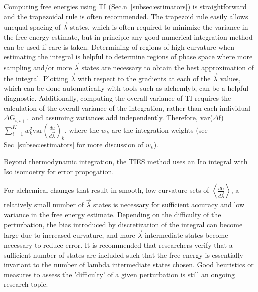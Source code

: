 \documentclass[9pt,bestpractices]{livecoms}
\newcommand{\expect}[1]{\left\langle{#1}\right\rangle}
\begin{document}
Computing free energies using TI (Sec.n~\ref{subsec:estimators}) is straightforward and the trapezoidal rule is often recommended. The trapezoid rule easily allows unequal spacing of $\vec{\lambda}$ states, which is often required to minimize the variance in the free energy estimate, but in principle any good numerical integration method can be used if care is taken.  
Determining of regions of high curvature when estimating the integral is helpful to determine regions of phase space where more sampling and/or more $\vec{\lambda}$ states are necessary to obtain the best approximation of the integral. Plotting $\vec{\lambda}$ with respect to the gradients at each of the $\vec{\lambda}$ values, which can be done automatically with tools such as alchemlyb,  can be a helpful diagnostic. 
Additionally, computing the overall variance of TI requires the calculation of the overall variance of the integration, rather than each individual $\Delta$G$_{i,i+1}$ and assuming variances add independently. 
Therefore, $\mathrm{var}$($\Delta$f) = $\sum_{i=1}^{K}w_{k}^2 \mathrm{var}(\frac{du}{d\vec{\lambda}})_{k}$, where the $w_k$ are the integration weights (see Sec~\ref{subsec:estimators} for more discussion of $w_k$).


Beyond thermodynamic integration, the TIES method\cite{bhati2017} uses an Ito integral with Iso isomoetry for error propogation.

For alchemical changes that result in smooth, low curvature sets of $\expect{\frac{dU}{d\vec{\lambda}}}$, a relatively small number of $\vec{\lambda}$ states is necessary for sufficient accuracy and low variance in the free energy estimate. 
Depending on the difficulty of the perturbation, the bias introduced by discretization of the integral can become large due to increased curvature, and more $\vec{\lambda}$ intermediate states become necessary to reduce error.
It is recommended that researchers verify that a sufficient number of states are included such that the free energy is essentially invariant to the number of lambda intermediate states chosen. Good heuristics or measures to assess the 'difficulty' of a given perturbation is still an ongoing research topic. 
\end{document}
